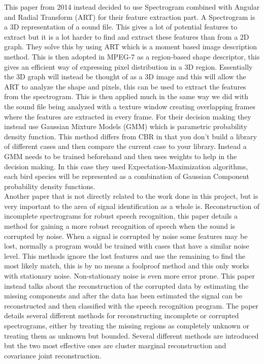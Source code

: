 This paper from 2014\cite{danne1} instead decided to use Spectrogram combined with
Angular and Radial Transform (ART) for their feature extraction part. A
Spectrogram is a 3D representation of a sound file. This gives a lot of
potential features to extract but it is a lot harder to find and extract
these features than from a 2D graph. They solve this by using ART which is a
moment based image description method. This is then adopted in MPEG-7 as a
region-based shape descriptor, this gives an efficient way of expressing pixel
distribution in a 3D region. Essentially the 3D graph will instead be thought
of as a 3D image and this will allow the ART to analyze the shape and pixels,
this can be used to extract the features from the spectrogram. This is then
applied much in the same way we did with the sound file being analyzed with a
texture window creating overlapping frames where the features are extracted in
every frame. For their decision making they instead use Gaussian Mixture Models
(GMM) which is parametric probability density function. This method differs
from CBR in that you don't build a library of different cases and then compare
the current case to your library. Instead a GMM needs to be trained beforehand
and then uses weights to help in the decision making. In this case they used
Expectation-Maximization algorithms, each bird species will be represented as
a combination of Gaussian Component probability density functions.\\

Another paper that is not directly related to the work done in this project,
but is very important to the area of signal identification as a whole is\cite{1566472}.
Reconstruction of incomplete spectrograms for robust speech recognition, this
paper details a method for gaining a more robust recognition of speech when the
sound is corrupted by noise. When a signal is corrupted by noise some features
may be lost, normally a program would be trained with cases that have a similar
noise level. This methods ignore the lost features and use the remaining to
find the most likely match, this is by no means a foolproof method and this
only works with stationary noise. Non-stationary noise is even more error prone.
 This paper instead talks about the reconstruction of the corrupted data by
 estimating the missing components and after the data has been estimated the
 signal can be reconstructed and then classified with the speech recognition
 program. The paper details several different methods for reconstructing
 incomplete or corrupted spectrograms, either by treating the missing regions
 as completely unknown or treating them as unknown but bounded. Several
 different methods are introduced but the two most effective ones are cluster
 marginal reconstruction and covariance joint reconstruction.\\



